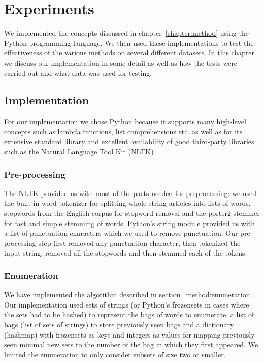 \chapter{Experiments}
\label{chapter:experiments}

We implemented the concepts discussed in chapter~\ref{chapter:method} using the Python programming language. We then used these implementations to test the effectiveness of the various methods on several different datasets. In this chapter we discuss our implementation in some detail as well as how the tests were carried out and what data was used for testing.

\section{Implementation}
For our implementation we chose Python because it supports many high-level concepts such as lambda functions, list comprehensions etc. as well as for its extensive standard library and excellent availability of good third-party libraries such as the Natural Language Tool Kit (NLTK)~\cite{nltk}.

\subsection{Pre-processing}
The NLTK provided us with most of the parts needed for preprocessing: we used the built-in word-tokenizer for splitting whole-string articles into lists of words,  stopwords from the English corpus for stopword-removal and the porter2 stemmer for fast and simple stemming of words. Python's string module provided us with a list of punctuation characters which we used to remove punctuation. Our pre-processing step first removed any punctuation character, then tokenized the input-string, removed all the stopwords and then stemmed each of the tokens.

\subsection{Enumeration}
We have implemented the algorithm described in section~\ref{method:enumeration}. Our implementation used sets of strings (or Python's frozensets in cases where the sets had to be hashed) to represent the bags of words to enumerate, a list of bags (list of sets of strings) to store previously seen bags and a dictionary (hashmap) with frozensets as keys and integers as values for mapping previously seen minimal new sets to the number of the bag in which they first appeared. We limited the enumeration to only consider subsets of size two or smaller.

